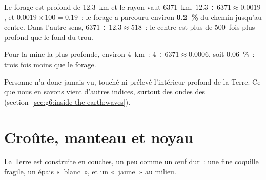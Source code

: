 \begin{example}\label{ex:g6:inside-the-earth:kola}
Le forage est profond de 12.3~km et le rayon vaut 6371~km.
$12.3 \div 6371 \approx 0.0019$, et $0.0019 \times 100 = 0.19$~: le forage
a parcouru environ \textbf{0.2~\%} du chemin jusqu'au centre. Dans l'autre
sens, $6371 \div 12.3 \approx 518$~: le centre est plus de 500~fois plus
profond que le fond du trou.

Pour la mine la plus profonde, environ 4~km~: $4 \div 6371 \approx 0.0006$,
soit 0.06~\%~: trois fois moins que le forage.
\end{example}

Personne n'a donc jamais vu, touché ni prélevé l'intérieur profond de la
Terre. Ce que nous en savons vient d'autres indices, surtout des ondes des
 (section~\ref{sec:g6:inside-the-earth:waves}).

\section{Croûte, manteau et noyau}

La Terre est construite en couches, un peu comme un œuf dur~: une fine
coquille fragile, un épais «~blanc~», et un «~jaune~» au milieu.

